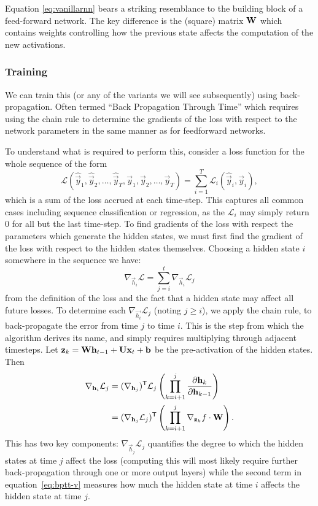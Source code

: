 Equation \eqref{eq:vanillarnn} bears a striking resemblance to the building block of a 
feed-forward network. The key difference is the (square) matrix \(\mathbf{W}\) which contains weights
controlling how the previous state affects the computation of the new activations.

\subsubsection{Training}
We can train this (or any of the variants we will see subsequently) using back-propagation.
Often termed ``Back Propagation Through Time'' \autocite{Werbos1990} which requires using the
chain rule to determine the gradients of the loss with respect to the network parameters in
the same manner as for feedforward networks.

To understand what is required to perform this, consider a loss function for the whole sequence of
the form
\begin{equation}
	\mathcal{L}(\hat{\vec{y}}_1, \hat{\vec{y}}_2, \dots, \hat{\vec{y}}_T,
				\vec{y}_1, \vec{y}_2, \dots, \vec{y}_T)
	= \sum_{i=1}^T \mathcal{L}_i(\hat{\vec{y}}_i, \vec{y}_i),
	\label{eq:seqloss}
\end{equation} which is a sum of the loss accrued at each time-step. This captures all common
cases including sequence classification or regression, as the \(\mathcal{L}_i\) may simply return
\(0\) for all but the last time-step. To find gradients of the loss with respect the parameters
which generate the hidden states, we must first find the gradient of the loss with respect to the
hidden states themselves. Choosing a hidden state \(i\) somewhere in the sequence we have:
\begin{equation}
	\nabla_{\vec{h}_i}\mathcal{L} = \sum_{j=i}^t \nabla_{\vec{h}_i}\mathcal{L}_j
	\label{eq:delhL}
\end{equation} from the definition of the loss and the fact that a hidden state may affect all
future losses. To determine each \(\nabla_{\vec{h_i}}\mathcal{L}_j\) (noting \(j \geq i\)), we
apply the chain rule, to back-propagate the error from time \(j\) to time \(i\). This is the step
from which the algorithm derives its name, and simply requires multiplying through adjacent
timesteps. Let \(\mathbf{z}_k = \mathbf{W}\mathbf{h}_{t-1} + \mathbf{U}\mathbf{x}_t +  \mathbf{b}\) be the
pre-activation of the hidden states. Then
\begin{align}
	\nabla_{\mathbf{h}_i} \mathcal{L}_j &= 
	(\nabla_{\mathbf{h}_j})^{\mathsf{T}}\mathcal{L}_j \left(
		\prod_{k=i+1}^j \frac{\partial \mathbf{h}_k}{\partial\mathbf{h}_{k-1}}\right)\\
	&=  (\nabla_{\mathbf{h}_j}\mathcal{L}_j)^{\mathsf{T}} \left(
		\prod_{k=i+1}^j \nabla_{\mathbf{z}_k}f \cdot \mathbf{W}\right).
	\label{eq:bptt-v}
\end{align} This has two key components: \(\nabla_{\vec{h}_j}\mathcal{L}_j\) quantifies the degree
to which the hidden states at time \(j\) affect the loss (computing this will most likely require
further back-propagation through one or more output layers) while the second term in
equation~\eqref{eq:bptt-v} measures how much the hidden state at time \(i\) affects the hidden
state at time \(j\).

